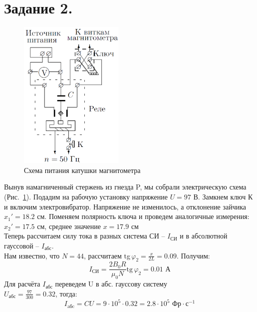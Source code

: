 \documentclass[a4paper, 12pt]{article}
\begin{document}
	\section*{Задание 2.}
	\begin{figure}
		\includegraphics[width=50mm]{station3.png}	
		\caption{Схема питания катушки магнитометра}
		\label{im:station3}
	\end{figure}
	Вынув намагниченный стержень из гнезда P, мы собрали электрическую схема (Рис.~\ref{im:station3}). Подадим на рабочую установку напряжение $U=97\text{ В}$. Замкнем ключ К и включим электровибратор. Напряжение не изменилось, а отклонение зайчика $x_1'=18.2\text{ см}$. Поменяем полярность ключа и проведем аналогичные измерения: $x_2'=17.5\text{ см}$, среднее значение $x=17.9\text{ см}$\\
	Теперь рассчитаем силу тока в разных система СИ -- $I_{\text{СИ}}$ и в абсолютной гауссовой -- $I_\text{абс}$. \\
	Нам известно, что $N=44$, рассчитаем tg$\,\varphi_2=\frac{x}{2L}=0.09$. Получим:
	$$I_{\text{СИ}}=\dfrac{2B_0R}{\mu_0N}\text{tg}\,\varphi_2=0.01\text{ А}$$
	Для расчёта $I_\text{абс}$ переведем U в абс. гауссову систему\\ $U_\text{абс}=\frac{97}{300}=0.32$, тогда:
	$$I_\text{aбc}=CU=9\cdot10^5\cdot0.32=2.8\cdot10^5\text{ Фр}\cdot\text{с}^{-1}$$  \\
\end{document}

